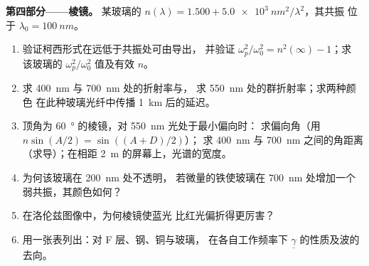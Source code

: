 \begin{problem}
\medskip
\noindent\textbf{第四部分——棱镜。}
某玻璃的 $n(\lambda) = 1.500 + \qty{5.0e3}{nm^2}/\lambda^2$，其共振
位于 $\lambda_0 = \qty{100}{nm}$。
\begin{enumerate}[resume]
  \item 验证柯西形式在远低于共振处可由导出，
        并验证 $\omega_p^2/\omega_0^2 = n^2(\infty) - 1$；求
        该玻璃的 $\omega_p^2/\omega_0^2$ 值及有效 $n$。
  \item 求 \qty{400}{nm} 与 \qty{700}{nm} 处的折射率与，
        求 \qty{550}{nm} 处的群折射率；求两种颜色
        在此种玻璃光纤中传播 \qty{1}{km} 后的延迟。
  \item 顶角为 \qty{60}{\degree} 的棱镜，对 \qty{550}{nm} 光处于最小偏向时：
        求偏向角（用 $n\sin(A/2) = \sin((A + D)/2)$）；
        求 \qty{400}{nm} 与 \qty{700}{nm} 之间的角距离（求导）；在相距
        \qty{2}{m} 的屏幕上，光谱的宽度。
  \item 为何该玻璃在 \qty{200}{nm} 处不透明，
        若微量的铁使玻璃在 \qty{700}{nm} 处增加一个弱共振，其颜色如何？
  \item 在洛伦兹图像中，为何棱镜使蓝光
        比红光偏折得更厉害？
  \item 用一张表列出：对 F 层、钢、铜与玻璃，
        在各自工作频率下
        $\underline\gamma$ 的性质及波的去向。
\end{enumerate}
\end{problem}
